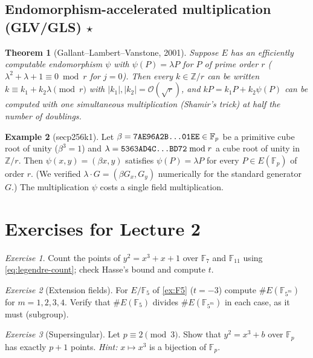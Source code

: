 \documentclass[11pt,a4paper,oneside]{book}
\theoremstyle{plain}
\newtheorem{theorem}{Theorem}[chapter]
\theoremstyle{definition}
\newtheorem{example}[theorem]{Example}
\theoremstyle{remark}
\newtheorem{exercise}{Exercise}[chapter]
\newcommand{\Z}{\mathbb{Z}}
\newcommand{\F}{\mathbb{F}}
\newcommand{\Fp}{\mathbb{F}_p}
\newcommand{\bigO}{\mathcal{O}}
\begin{document}
\subsection{Endomorphism-accelerated multiplication (GLV/GLS) \texorpdfstring{$\star$}{*}}\label{sec:glv}

\begin{theorem}[Gallant--Lambert--Vanstone, 2001]
Suppose $E$ has an efficiently computable endomorphism $\psi$ with $\psi(P)=\lambda P$ for $P$ of prime order $r$ ($\lambda^2+\lambda+1\equiv0\bmod r$ for $j=0$). Then every $k\in\Z/r$ can be written $k\equiv k_1+k_2\lambda\pmod r$ with $|k_1|,|k_2|=\bigO(\sqrt r)$, and $kP=k_1P+k_2\psi(P)$ can be computed with one simultaneous multiplication (Shamir's trick) at half the number of doublings.
\end{theorem}

\begin{example}[secp256k1]
Let $\beta=\texttt{7AE96A2B\dots{}01EE}\in\Fp$ be a primitive cube root of unity ($\beta^3=1$) and $\lambda=\texttt{5363AD4C\dots{}BD72}\bmod r$ a cube root of unity in $\Z/r$. Then $\psi(x,y)=(\beta x,y)$ satisfies $\psi(P)=\lambda P$ for every $P\in E(\Fp)$ of order $r$. (We verified $\lambda\cdot G=(\beta G_x,G_y)$ numerically for the standard generator $G$.) The multiplication $\psi$ costs a single field multiplication.
\end{example}

\section*{Exercises for Lecture 2}

\begin{exercise}
Count the points of $y^2=x^3+x+1$ over $\F_7$ and $\F_{11}$ using \eqref{eq:legendre-count}; check Hasse's bound and compute $t$.
\end{exercise}

\begin{exercise}[Extension fields]
For $E/\F_5$ of \cref{ex:F5} ($t=-3$) compute $\#E(\F_{5^m})$ for $m=1,2,3,4$. Verify that $\#E(\F_5)$ divides $\#E(\F_{5^m})$ in each case, as it must (subgroup).
\end{exercise}

\begin{exercise}[Supersingular]
Let $p\equiv2\pmod3$. Show that $y^2=x^3+b$ over $\Fp$ has exactly $p+1$ points. \emph{Hint:} $x\mapsto x^3$ is a bijection of $\Fp$.
\end{exercise}
\end{document}
